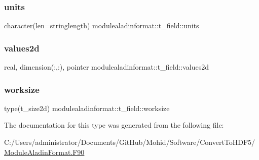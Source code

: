 \subsubsection{\texorpdfstring{units}{units}}
{\footnotesize\ttfamily character(len=stringlength) modulealadinformat\+::t\+\_\+field\+::units\hspace{0.3cm}{\ttfamily [private]}}

\mbox{\label{structmodulealadinformat_1_1t__field_a80939e3247154b84147233556c553b4c}} 
\subsubsection{\texorpdfstring{values2d}{values2d}}
{\footnotesize\ttfamily real, dimension(\+:,\+:), pointer modulealadinformat\+::t\+\_\+field\+::values2d\hspace{0.3cm}{\ttfamily [private]}}

\mbox{\label{structmodulealadinformat_1_1t__field_a5020e210dfe08481923211ffcb9f8f63}} 
\subsubsection{\texorpdfstring{worksize}{worksize}}
{\footnotesize\ttfamily type(t\+\_\+size2d) modulealadinformat\+::t\+\_\+field\+::worksize\hspace{0.3cm}{\ttfamily [private]}}



The documentation for this type was generated from the following file\+:\begin{DoxyCompactItemize}
\item 
C\+:/\+Users/administrator/\+Documents/\+Git\+Hub/\+Mohid/\+Software/\+Convert\+To\+H\+D\+F5/\mbox{\hyperlink{_module_aladin_format_8_f90}{Module\+Aladin\+Format.\+F90}}\end{DoxyCompactItemize}

